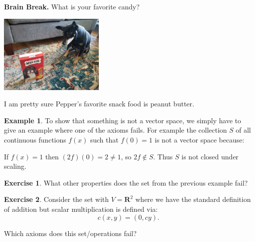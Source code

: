 \documentclass{beamer}
\newcommand{\R}{\mathbf{R}}
\newcommand{\fn}{\insertframenumber}
\theoremstyle{definition}
\newtheorem{exercise}{Exercise}
\newtheorem*{exa}{Example}
\begin{document}
\begin{frame}{\fn}
	\begin{block}{\textbf{Brain Break.}}
		What is your favorite candy?
		\begin{center}
			\includegraphics[width=2in]{images/treat_Pepper}
		\end{center}
		I am pretty sure Pepper's favorite snack food is peanut butter.
	\end{block}
\end{frame}
\begin{frame}{\fn}
	\begin{exa}
		To show that something is not a vector space, we simply have to give an example where one of the axioms fails.  For example the collection $S$ of all continuous functions $f(x)$ such that $f(0)=1$ is not a vector space because:
		
			\begin{center}
				\begin{minipage}{.8\textwidth}
					If $f(x)=1$ then $(2f)(0)=2\neq1$, so $2f\not\in S $. Thus $S$ is not closed under scaling.\hfill\qedsymbol
				\end{minipage}
			\end{center} 
	\end{exa}
	\begin{exercise}
		What other properties does the set from the previous example fail?
	\end{exercise}
\end{frame}
\begin{frame}{\fn}
	\begin{exercise}
		Consider the set with $V=\R^2$ where we have the standard definition of addition but scalar multiplication is defined via:\[c(x,y)=(0,cy).\]
		
		Which axioms does this set/operations fail?
	\end{exercise}
\end{frame}
\end{document}
